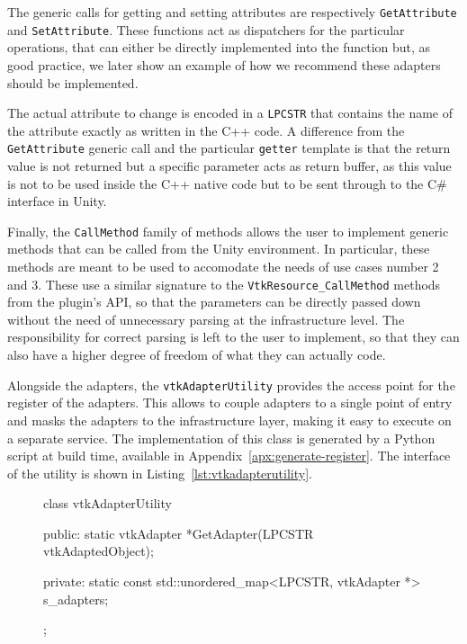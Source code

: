 The generic calls for getting and setting attributes are respectively \verb|GetAttribute| and \verb|SetAttribute|. These functions act as dispatchers for the particular operations, that can either be directly implemented into the function but, as good practice, we later show an example of how we recommend these adapters should be implemented.

The actual attribute to change is encoded in a \verb|LPCSTR| that contains the name of the attribute exactly as written in the C++ code. A difference from the \verb|GetAttribute| generic call and the particular \verb|getter| template is that the return value is not returned but a specific parameter acts as return buffer, as this value is not to be used inside the C++ native code but to be sent through to the C\# interface in Unity.

Finally, the \verb|CallMethod| family of methods allows the user to implement generic methods that can be called from the Unity environment. In particular, these methods are meant to be used to accomodate the needs of use cases number 2 and 3. These use a similar signature to the \verb|VtkResource_CallMethod| methods from the plugin's API, so that the parameters can be directly passed down without the need of unnecessary parsing at the infrastructure level. The responsibility for correct parsing is left to the user to implement, so that they can also have a higher degree of freedom of what they can actually code.

Alongside the adapters, the \verb|vtkAdapterUtility| provides the access point for the register of the adapters. This allows to couple adapters to a single point of entry and masks the adapters to the infrastructure layer, making it easy to execute on a separate service. The implementation of this class is generated by a Python script at build time, available in Appendix~\ref{apx:generate-register}. The interface of the utility is shown in Listing~\ref{lst:vtkadapterutility}.

\begin{figure}[ht!]
    \centering
    \begin{cpp}[label=lst:vtkadapterutility,caption={vtkAdapterUtility interface}]
class vtkAdapterUtility
{
public:
	static vtkAdapter *GetAdapter(LPCSTR vtkAdaptedObject);

private:
	static const std::unordered_map<LPCSTR, vtkAdapter *> s_adapters;
};
    \end{cpp}
\end{figure}

